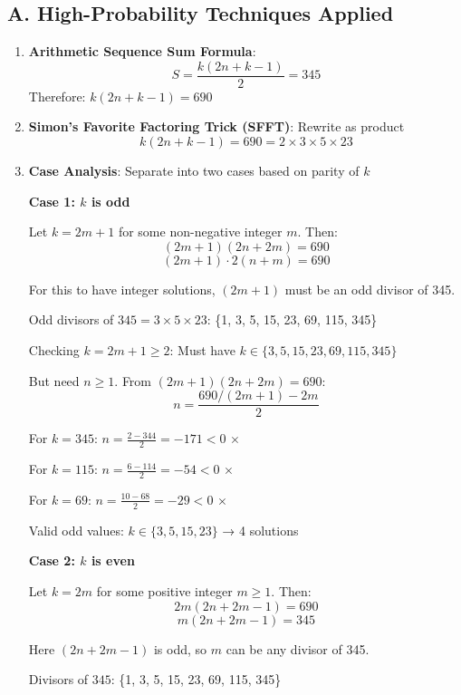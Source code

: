 \documentclass[11pt]{article}
\begin{document}
\begin{conversionbox}
\subsection*{A. High-Probability Techniques Applied}
\begin{enumerate}[leftmargin=*]
    \item \textbf{Arithmetic Sequence Sum Formula}: 
    \[S = \frac{k(2n + k - 1)}{2} = 345\]
    Therefore: $k(2n + k - 1) = 690$
    
    \item \textbf{Simon's Favorite Factoring Trick (SFFT)}: Rewrite as product
    \[k(2n + k - 1) = 690 = 2 \times 3 \times 5 \times 23\]
    
    \item \textbf{Case Analysis}: Separate into two cases based on parity of $k$
    
    \textbf{Case 1: $k$ is odd}
    
    Let $k = 2m + 1$ for some non-negative integer $m$. Then:
    \[(2m+1)(2n + 2m) = 690\]
    \[(2m+1) \cdot 2(n+m) = 690\]
    
    For this to have integer solutions, $(2m+1)$ must be an odd divisor of 345.
    
    Odd divisors of $345 = 3 \times 5 \times 23$: \{1, 3, 5, 15, 23, 69, 115, 345\}
    
    Checking $k = 2m+1 \geq 2$: Must have $k \in \{3, 5, 15, 23, 69, 115, 345\}$
    
    But need $n \geq 1$. From $(2m+1)(2n+2m) = 690$:
    \[n = \frac{690/(2m+1) - 2m}{2}\]
    
    For $k = 345$: $n = \frac{2 - 344}{2} = -171 < 0$ $\times$
    
    For $k = 115$: $n = \frac{6 - 114}{2} = -54 < 0$ $\times$
    
    For $k = 69$: $n = \frac{10 - 68}{2} = -29 < 0$ $\times$
    
    Valid odd values: $k \in \{3, 5, 15, 23\}$ → 4 solutions
    
    \textbf{Case 2: $k$ is even}
    
    Let $k = 2m$ for some positive integer $m \geq 1$. Then:
    \[2m(2n + 2m - 1) = 690\]
    \[m(2n + 2m - 1) = 345\]
    
    Here $(2n + 2m - 1)$ is odd, so $m$ can be any divisor of 345.
    
    Divisors of $345$: \{1, 3, 5, 15, 23, 69, 115, 345\}
    

\end{enumerate}
\end{conversionbox}
\end{document}
